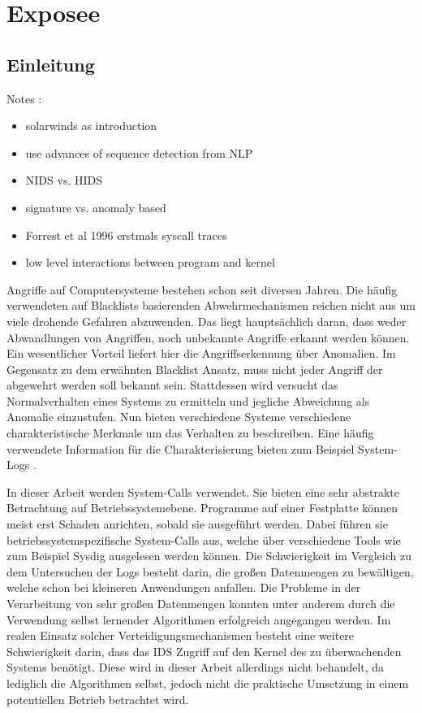 \chapter{Exposee}\label{ch:introduction}
\section{Einleitung}
Notes :

\begin{itemize}
    \item solarwinds as introduction
    \item use advances of sequence detection from NLP
    \item NIDS vs. HIDS
    \item signature vs. anomaly based
    \item Forrest et al 1996 erstmals syscall traces
    \item low level interactions between program and kernel
\end{itemize}

Angriffe auf Computersysteme bestehen schon seit diversen Jahren. 
Die häufig verwendeten auf Blacklists basierenden Abwehrmechanismen reichen nicht aus um viele drohende Gefahren abzuwenden.
Das liegt hauptsächlich daran, dass weder Abwandlungen von Angriffen, noch unbekannte Angriffe erkannt werden können.
Ein wesentlicher Vorteil liefert hier die Angriffserkennung über Anomalien.
Im Gegensatz zu dem erwähnten Blacklist Ansatz, muss nicht jeder Angriff der abgewehrt werden soll bekannt sein.
Stattdessen wird versucht das Normalverhalten eines Systems zu ermitteln und jegliche Abweichung als Anomalie einzustufen.
Nun bieten verschiedene Systeme verschiedene charakteristische Merkmale um das Verhalten zu beschreiben. 
Eine häufig verwendete Information für die Charakterisierung bieten zum Beispiel System-Logs \cite{HE}.

In dieser Arbeit werden System-Calls verwendet.
Sie bieten eine sehr abstrakte Betrachtung auf Betriebssystemebene.
Programme auf einer Festplatte können meist erst Schaden anrichten, sobald sie ausgeführt werden.
Dabei führen sie betriebssystemspezifische System-Calls aus, welche über verschiedene Tools wie zum Beispiel Sysdig \cite{SYSDIG} ausgelesen werden können.
Die Schwierigkeit im Vergleich zu dem Untersuchen der Logs besteht darin, die großen Datenmengen zu bewältigen, welche schon bei kleineren Anwendungen anfallen.
Die Probleme in der Verarbeitung von sehr großen Datenmengen konnten unter anderem durch die Verwendung selbst lernender Algorithmen erfolgreich angegangen werden.
Im realen Einsatz solcher Verteidigungsmechanismen besteht eine weitere Schwierigkeit darin, dass das IDS Zugriff auf den Kernel des zu überwachenden Systems benötigt.
Diese wird in dieser Arbeit allerdings nicht behandelt, da lediglich die Algorithmen selbst, jedoch nicht die praktische Umsetzung in einem potentiellen Betrieb betrachtet wird.

